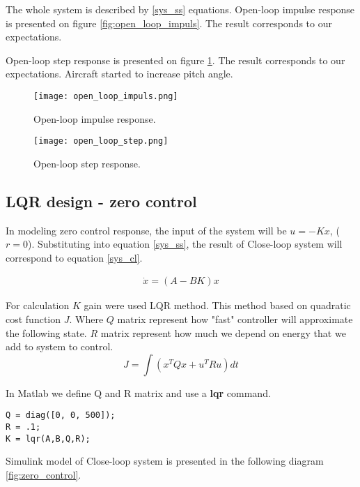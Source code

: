 \documentclass[../report.tex]{subfiles}
\begin{document}
The whole system is described by \ref{sys_ss} equations.
Open-loop impulse response is presented on figure
\ref{fig:open_loop_impuls}. The result corresponds to our expectations.

Open-loop step response is presented on figure
\ref{fig:open_loop_step}. The result corresponds to our expectations.
Aircraft started to increase pitch angle.

\begin{figure}[hbt!]
    \centering
    \begin{minipage}{.5\textwidth}
    \centering
    \texttt{[image: open\_loop\_impuls.png]}
    \caption{Open-loop impulse response.}
    \label{fig:open_loop_impuls}
\end{minipage}%
\begin{minipage}{.5\textwidth}
    \centering
    \texttt{[image: open\_loop\_step.png]}
    \caption{Open-loop step response.}
    \label{fig:open_loop_step}
\end{minipage}
\end{figure}


\pagebreak

\subsection{LQR design - zero control}
In modeling zero control response, the input of the system
will be $u = -Kx$, ($r=0$). Substituting into equation \ref{sys_ss}, the
result of Close-loop system will correspond to equation \ref{sys_cl}.

\begin{align}\label{sys_cl}
    \dot{x} = (A-BK)x
\end{align}

For calculation $K$ gain were used LQR method. This method based on quadratic
cost function $J$. Where $Q$ matrix represent how "fast" controller will approximate 
the following state. 
$R$ matrix represent how much we depend on energy that we add to system to
control.
\begin{equation}
J=\int(x^TQx + u^TRu)dt
\end{equation}


In Matlab we define Q and R matrix and use a \textbf{lqr} command.
\begin{lstlisting}[frame=single]
Q = diag([0, 0, 500]);
R = .1;
K = lqr(A,B,Q,R);
\end{lstlisting}

Simulink model of Close-loop system is presented in the following diagram
\ref{fig:zero_control}.
\end{document}
